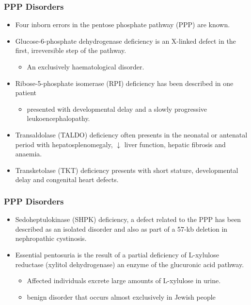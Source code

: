 \documentclass{scrartcl}
\begin{document}
\subsubsection{PPP Disorders}
\label{sec:orgf518e28}

\begin{itemize}
\item Four inborn errors in the pentose phosphate pathway (PPP) are known.
\item Glucose-6-phosphate dehydrogenase deficiency is an X-linked defect
in the first, irreversible step of the pathway.
\begin{itemize}
\item An exclusively haematological disorder.
\end{itemize}
\item Ribose-5-phosphate isomerase (RPI) deficiency has been described in one patient
\begin{itemize}
\item presented with developmental delay and a slowly progressive leukoencephalopathy.
\end{itemize}
\item Transaldolase (TALDO) deficiency often presents in the neonatal or
antenatal period with hepatosplenomegaly, \(\downarrow\) liver function,
hepatic fibrosis and anaemia.
\item Transketolase (TKT) deficiency presents with short stature,
developmental delay and congenital heart defects.
\end{itemize}

\subsubsection{PPP Disorders}
\label{sec:org59a002d}
\begin{itemize}
\item Sedoheptulokinase (SHPK) deficiency, a defect related to the PPP has
been described as an isolated disorder and also as part of a 57-kb
deletion in nephropathic cystinosis.
\item Essential pentosuria is the result of a partial deficiency of L-xylulose reductase (xylitol dehydrogenase) an enzyme of the glucuronic acid pathway.
\begin{itemize}
\item Affected individuals excrete large amounts of L-xylulose in urine.
\item benign disorder that occurs almost exclusively in Jewish people
\end{itemize}
\end{itemize}
\end{document}
